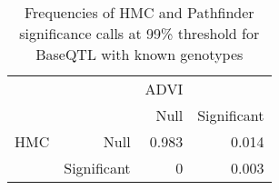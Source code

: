 \begin{table}[ht]
\centering
\caption{Frequencies of HMC and Pathfinder significance calls at 99\% threshold for BaseQTL with known genotypes} 
\label{tab:GT-xtab-prop-99-pf}
\begin{tabular}{rr|rr}
   &  & ADVI &  \\ 
    &   & Null & Significant \\ 
   \hline
HMC & Null & 0.983 & 0.014 \\ 
    & Significant & 0 & 0.003 \\ 
  \end{tabular}
\end{table}

